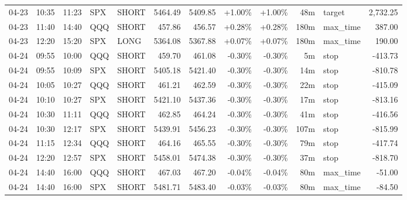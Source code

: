 \documentclass[11pt,a4paper]{article}
\begin{document}
\begin{center}
\begin{longtable}{>{\color{txtmain}}l l l l l r r r r r >{\color{txtmain}}l r}
04-23 & 10:35 & 11:23 & SPX & SHORT & 5464.49 & 5409.85 & \textcolor{wingreen}{+1.00\%} & \textcolor{wingreen}{+1.00\%} & 48m & target & \textcolor{wingreen}{2,732.25} \\
04-23 & 11:40 & 14:40 & QQQ & SHORT & 457.86 & 456.57 & \textcolor{wingreen}{+0.28\%} & \textcolor{wingreen}{+0.28\%} & 180m & max\_time & \textcolor{wingreen}{387.00} \\
04-23 & 12:20 & 15:20 & SPX & LONG & 5364.08 & 5367.88 & \textcolor{wingreen}{+0.07\%} & \textcolor{wingreen}{+0.07\%} & 180m & max\_time & \textcolor{wingreen}{190.00} \\
04-24 & 09:55 & 10:00 & QQQ & SHORT & 459.70 & 461.08 & \textcolor{lossred}{-0.30\%} & \textcolor{lossred}{-0.30\%} & 5m & stop & \textcolor{lossred}{-413.73} \\
04-24 & 09:55 & 10:09 & SPX & SHORT & 5405.18 & 5421.40 & \textcolor{lossred}{-0.30\%} & \textcolor{lossred}{-0.30\%} & 14m & stop & \textcolor{lossred}{-810.78} \\
04-24 & 10:05 & 10:27 & QQQ & SHORT & 461.21 & 462.59 & \textcolor{lossred}{-0.30\%} & \textcolor{lossred}{-0.30\%} & 22m & stop & \textcolor{lossred}{-415.09} \\
04-24 & 10:10 & 10:27 & SPX & SHORT & 5421.10 & 5437.36 & \textcolor{lossred}{-0.30\%} & \textcolor{lossred}{-0.30\%} & 17m & stop & \textcolor{lossred}{-813.16} \\
04-24 & 10:30 & 11:11 & QQQ & SHORT & 462.85 & 464.24 & \textcolor{lossred}{-0.30\%} & \textcolor{lossred}{-0.30\%} & 41m & stop & \textcolor{lossred}{-416.56} \\
04-24 & 10:30 & 12:17 & SPX & SHORT & 5439.91 & 5456.23 & \textcolor{lossred}{-0.30\%} & \textcolor{lossred}{-0.30\%} & 107m & stop & \textcolor{lossred}{-815.99} \\
04-24 & 11:15 & 12:34 & QQQ & SHORT & 464.16 & 465.55 & \textcolor{lossred}{-0.30\%} & \textcolor{lossred}{-0.30\%} & 79m & stop & \textcolor{lossred}{-417.74} \\
04-24 & 12:20 & 12:57 & SPX & SHORT & 5458.01 & 5474.38 & \textcolor{lossred}{-0.30\%} & \textcolor{lossred}{-0.30\%} & 37m & stop & \textcolor{lossred}{-818.70} \\
04-24 & 14:40 & 16:00 & QQQ & SHORT & 467.03 & 467.20 & \textcolor{lossred}{-0.04\%} & \textcolor{lossred}{-0.04\%} & 80m & max\_time & \textcolor{lossred}{-51.00} \\
04-24 & 14:40 & 16:00 & SPX & SHORT & 5481.71 & 5483.40 & \textcolor{lossred}{-0.03\%} & \textcolor{lossred}{-0.03\%} & 80m & max\_time & \textcolor{lossred}{-84.50} \\

\end{longtable}
\end{center}
\end{document}

